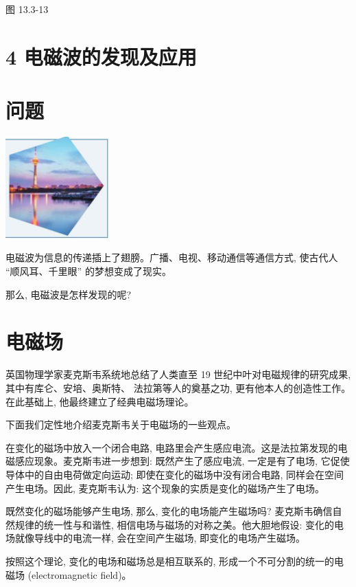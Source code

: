 \documentclass[10pt]{article}
\begin{document}
图 13.3-13

\section*{4 电磁波的发现及应用}

\section*{问题}

\begin{center}
\includegraphics[max width=0.3\textwidth]{images/01911d5f-8e38-70c0-b5b8-2b399bd115b6_124_748359.jpg}
\end{center}

电磁波为信息的传递插上了翅膀。广播、电视、移动通信等通信方式, 使古代人 “顺风耳、千里眼” 的梦想变成了现实。

那么, 电磁波是怎样发现的呢?

\section*{电磁场}

英国物理学家麦克斯韦系统地总结了人类直至 19 世纪中叶对电磁规律的研究成果, 其中有库仑、安培、奥斯特、 法拉第等人的奠基之功, 更有他本人的创造性工作。在此基础上, 他最终建立了经典电磁场理论。

下面我们定性地介绍麦克斯韦关于电磁场的一些观点。

在变化的磁场中放入一个闭合电路, 电路里会产生感应电流。这是法拉第发现的电磁感应现象。麦克斯韦进一步想到: 既然产生了感应电流, 一定是有了电场, 它促使导体中的自由电荷做定向运动; 即使在变化的磁场中没有闭合电路, 同样会在空间产生电场。因此, 麦克斯韦认为: 这个现象的实质是变化的磁场产生了电场。

既然变化的磁场能够产生电场, 那么, 变化的电场能产生磁场吗? 麦克斯韦确信自然规律的统一性与和谐性, 相信电场与磁场的对称之美。他大胆地假设: 变化的电场就像导线中的电流一样, 会在空间产生磁场, 即变化的电场产生磁场。

按照这个理论, 变化的电场和磁场总是相互联系的, 形成一个不可分割的统一的电磁场 (electromagnetic field)。
\end{document}
